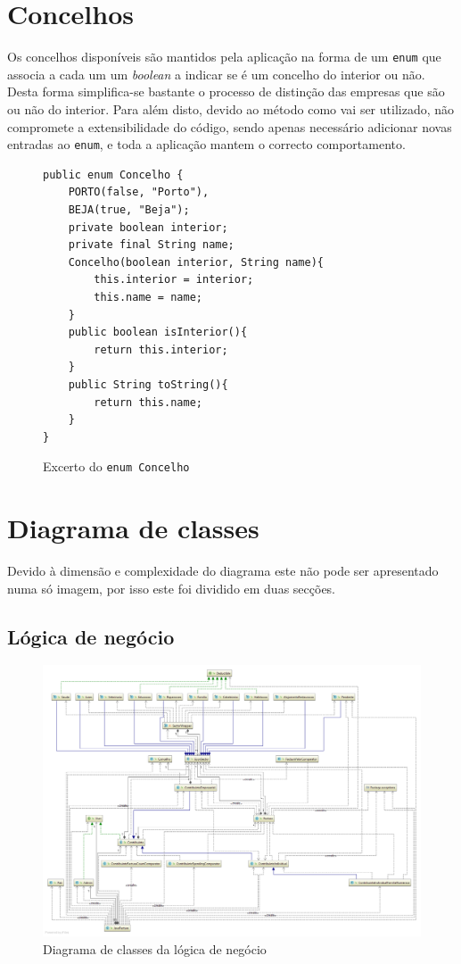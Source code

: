 \documentclass[12pt,a4paper]{report}
\begin{document}
\section{Concelhos}
\label{sec:concelho}
    Os concelhos disponíveis são mantidos pela aplicação na forma de um
    \texttt{enum} que associa a cada um um \textit{boolean} a indicar se
    é um concelho do interior ou não. Desta forma simplifica-se bastante o processo
    de distinção das empresas que são ou não do interior. Para além disto, devido
    ao método como vai ser utilizado, não compromete a extensibilidade do código,
    sendo apenas necessário adicionar novas entradas ao \texttt{enum}, e
    toda a aplicação mantem o correcto comportamento.

    \begin{figure}[h]
        \begin{verbatim}
public enum Concelho {
    PORTO(false, "Porto"),
    BEJA(true, "Beja");
    private boolean interior;
    private final String name;
    Concelho(boolean interior, String name){
        this.interior = interior;
        this.name = name;
    }
    public boolean isInterior(){
        return this.interior;
    }
    public String toString(){
        return this.name;
    }
}
        \end{verbatim}
        \caption{Excerto do \texttt{enum Concelho}}
        \label{fig:concelhos}
    \end{figure}

\section{Diagrama de classes}
    Devido à dimensão e complexidade do diagrama este não pode ser apresentado numa só imagem,
    por isso este foi dividido em duas secções.
    \subsection{Lógica de negócio}
    \begin{figure}[H]
        \centering
        \includegraphics[width=\textwidth]{./images/businessFull.png}
        \caption{Diagrama de classes da lógica de negócio}
    \end{figure}
\end{document}
